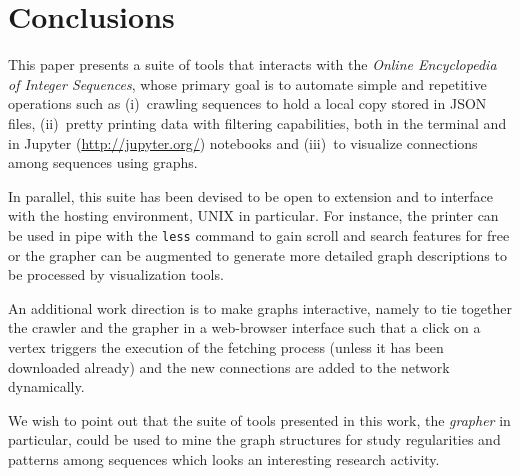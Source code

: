 \section*{Conclusions}

This paper presents a suite of tools that interacts with the \textit{Online
Encyclopedia of Integer Sequences}, whose primary goal is to automate simple
and repetitive operations such as (i)~crawling sequences to hold a local copy
stored in JSON files, (ii)~pretty printing data with filtering capabilities,
both in the terminal and in Jupyter (\url{http://jupyter.org/}) notebooks and
(iii)~to visualize connections among sequences using graphs.

In parallel, this suite has been devised to be open to extension
and to interface with the hosting environment, UNIX in particular. For
instance, the printer can be used in pipe with the \verb|less| command to gain
scroll and search features for free or the grapher can be augmented to generate
more detailed graph descriptions to be processed by visualization tools.

An additional work direction is to make graphs interactive, namely to tie
together the crawler and the grapher in a web-browser interface such that a
click on a vertex triggers the execution of the fetching process (unless it has
been downloaded already) and the new connections are added to the network
dynamically.

We wish to point out that the suite of tools presented in this work, the
\textit{grapher} in particular, could be used to mine the graph structures
for study regularities and patterns among sequences which looks an interesting
research activity.

